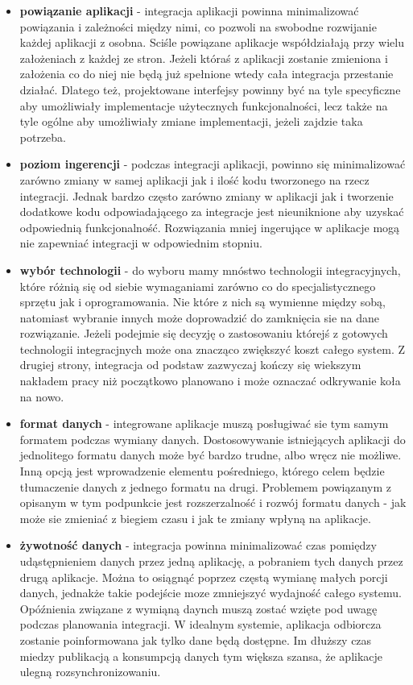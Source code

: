\begin{itemize}
	\item \textbf{powiązanie aplikacji} - integracja aplikacji powinna minimalizować powiązania i zależności między nimi, co pozwoli na swobodne rozwijanie każdej aplikacji z osobna. Sciśle powiązane aplikacje współdziałają przy wielu założeniach z każdej ze stron. Jeżeli któraś z aplikacji zostanie zmieniona i założenia co do niej nie będą już spełnione wtedy cała integracja przestanie działać. Dlatego też, projektowane interfejsy powinny być na tyle specyficzne aby umożliwiały implementacje użytecznych funkcjonalności, lecz także na tyle ogólne aby umożliwiały zmiane implementacji, jeżeli zajdzie taka potrzeba.
	\item \textbf{poziom ingerencji} - podczas integracji aplikacji, powinno się minimalizować zarówno zmiany w samej aplikacji jak i ilość kodu tworzonego na rzecz integracji. Jednak bardzo często zarówno zmiany w aplikacji jak i tworzenie dodatkowe kodu odpowiadającego za integracje jest nieuniknione aby uzyskać odpowiednią funkcjonalność. Rozwiązania mniej ingerujące w aplikacje mogą nie zapewniać integracji w odpowiednim stopniu.
	\item \textbf{wybór technologii} - do wyboru mamy mnóstwo technologii integracyjnych, które różnią się od siebie wymaganiami zarówno co do specjalistycznego sprzętu jak i oprogramowania. Nie które z nich są wymienne między sobą, natomiast wybranie innych może doprowadzić do zamknięcia sie na dane rozwiązanie. Jeżeli podejmie się decyzję o zastosowaniu którejś z gotowych technologii integracjnych może ona znacząco zwiększyć koszt całego system. Z drugiej strony, integracja od podstaw zazwyczaj kończy się wiekszym nakładem pracy niż początkowo planowano i może oznaczać odkrywanie koła na nowo.
	\item \textbf{format danych} - integrowane aplikacje muszą posługiwać sie tym samym formatem podczas wymiany danych. Dostosowywanie istniejących aplikacji do jednolitego formatu danych może być bardzo trudne, albo wręcz nie możliwe. Inną opcją jest wprowadzenie elementu pośredniego, którego celem będzie tłumaczenie danych z jednego formatu na drugi. Problemem powiązanym z opisanym w tym podpunkcie jest rozszerzalność i rozwój formatu danych - jak może sie zmieniać z biegiem czasu i jak te zmiany wpłyną na aplikacje.
	\item \textbf{żywotność danych} - integracja powinna minimalizować czas pomiędzy udąstępnieniem danych przez jedną aplikację, a pobraniem tych danych przez drugą aplikacje. Można to osiągnąć poprzez częstą wymianę małych porcji danych, jednakże takie podejście moze zmniejszyć wydajność całego systemu. Opóźnienia związane z wymiąną daynch muszą zostać wzięte pod uwagę podczas planowania integracji. W idealnym systemie, aplikacja odbiorcza zostanie poinformowana jak tylko dane będą dostępne. Im dłuższy czas miedzy publikacją a konsumpcją danych tym większa szansa, że aplikacje ulegną rozsynchronizowaniu.

\end{itemize}
